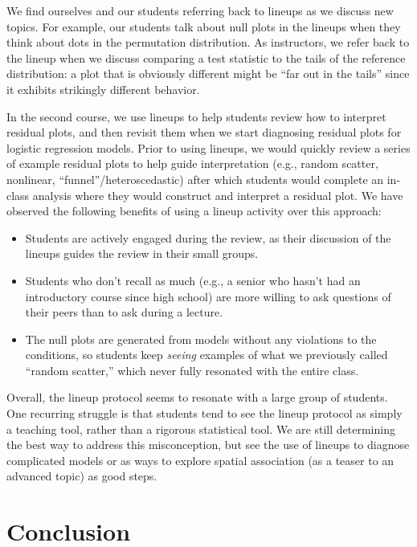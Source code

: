 \documentclass[12pt]{article}
\providecommand{\tightlist}{%
  \setlength{\itemsep}{0pt}\setlength{\parskip}{0pt}}
\begin{document}
We find ourselves and our students referring back to lineups as we
discuss new topics. For example, our students talk about null plots in
the lineups when they think about dots in the permutation distribution.
As instructors, we refer back to the lineup when we discuss comparing a
test statistic to the tails of the reference distribution: a plot that
is obviously different might be ``far out in the tails'' since it
exhibits strikingly different behavior.

In the second course, we use lineups to help students review how to
interpret residual plots, and then revisit them when we start diagnosing
residual plots for logistic regression models. Prior to using lineups,
we would quickly review a series of example residual plots to help guide
interpretation (e.g., random scatter, nonlinear,
``funnel''/heteroscedastic) after which students would complete an
in-class analysis where they would construct and interpret a residual
plot. We have observed the following benefits of using a lineup activity
over this approach:

\begin{itemize}
\tightlist
\item
  Students are actively engaged during the review, as their discussion
  of the lineups guides the review in their small groups.
\item
  Students who don't recall as much (e.g., a senior who hasn't had an
  introductory course since high school) are more willing to ask
  questions of their peers than to ask during a lecture.
\item
  The null plots are generated from models without any violations to the
  conditions, so students keep \emph{seeing} examples of what we
  previously called ``random scatter,'' which never fully resonated with
  the entire class.
\end{itemize}

Overall, the lineup protocol seems to resonate with a large group of
students. One recurring struggle is that students tend to see the lineup
protocol as simply a teaching tool, rather than a rigorous statistical
tool. We are still determining the best way to address this
misconception, but see the use of lineups to diagnose complicated models
or as ways to explore spatial association (as a teaser to an advanced
topic) as good steps.

\hypertarget{conclusion}{%
\section{Conclusion}\label{conclusion}}
\end{document}
